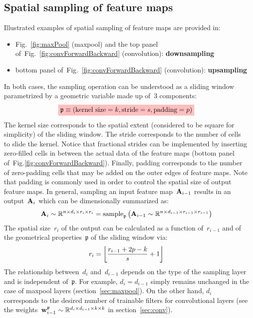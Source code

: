 \documentclass{article}
\newcommand{\mathcolorbox}[2]{\colorbox{#1}{$\displaystyle #2$}}
\DeclarePairedDelimiter\floor{\lfloor}{\rfloor}
\begin{document}
\begin{appendices}

\section{Spatial sampling of feature maps}
\label{sec:sample}

\noindent Illustrated examples of spatial sampling of feature maps are provided in:
\begin{itemize}
\item Fig.~\ref{fig:maxPool} (maxpool) and the top panel of~Fig.~\ref{fig:convForwardBackward} (convolution): {\bf downsampling}
\item bottom panel of~Fig.~\ref{fig:convForwardBackward} (convolution): {\bf upsampling}
\end{itemize}
In both cases, the sampling operation can be understood as a sliding window parametrized by a geometric variable made up of~3 components:
\begin{equation}
\mathcolorbox{pink}{\mathfrak{p} \equiv \left( \makebox{kernel size} = k, \text{stride} = s, \text{padding} = p \right)}
\label{eq:triplet}
\end{equation}
The kernel size corresponds to the spatial extent (considered to be square for simplicity) of the sliding window.  The stride corresponds to the number of cells to slide the kernel.  Notice that fractional strides can be implemented by inserting zero-filled cells in between the actual data of the feature maps (bottom panel of~Fig.\ref{fig:convForwardBackward}). Finally, padding corresponds to the number of zero-padding cells that may be added on the outer edges of feature maps.  Note that padding is commonly used in order to control the spatial size of output feature maps.  In general, sampling an input feature map~${\bf A}_{i-1}$ results in an output~${\bf A}_i$ which can be dimensionally summarized as:
\begin{equation*}
{\bf A}_i \sim \mathbb{R}^{n \times d_i \times r_i \times r_i} = \text{sample}_\mathfrak{p}  \left( {\bf A}_{i-1} \sim \mathbb{R}^{n \times d_{i-1} \times r_{i-1} \times r_{i-1}} \right)
\end{equation*}
The spatial size~$r_i$ of the output can be calculated as a function of~$r_{i-1}$ and of the geometrical properties~$\mathfrak{p}$ of the sliding window via:
\begin{equation}
r_i = \floor*{\frac{r_{i-1} + 2p -k}{s} + 1} 
\label{eq:subSample}
\end{equation}
The relationship between~$d_i$ and~$d_{i-1}$ depends on the type of the sampling layer and is independent of~$\mathfrak{p}$.  For example, $d_i = d_{i-1}$ simply remains unchanged in the case of maxpool layers (section~\ref{sec:maxpool}).  On the other hand, $d_i$ corresponds to the desired number of trainable filters for convolutional layers (see the weights~${\bf w}_{i-1}^\mathfrak{p} \sim \mathbb{R}^{d_i \times d_{i-1} \times k \times k}$ in section~\ref{sec:conv}).


\end{appendices}
\end{document}
